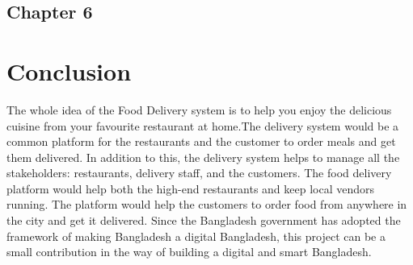 \begin{center}
    \section*{\fontsize{20}{20}\selectfont Chapter 6}
\end{center}
\vspace{10mm}

\section{Conclusion}


The whole idea of the Food Delivery system is to help you enjoy the delicious cuisine from your favourite restaurant at home.The delivery system would  be a common platform for the restaurants and the customer to order meals and get them delivered. In addition to this, the delivery system helps to manage all the stakeholders: restaurants, delivery staff, and the customers. The food delivery platform would help both the high-end restaurants and keep local vendors running. The platform would help the customers to order food from anywhere in the city and get it delivered. Since the Bangladesh government has adopted the framework of making Bangladesh a digital Bangladesh, this project can be a small contribution in the way of building a digital and smart Bangladesh.